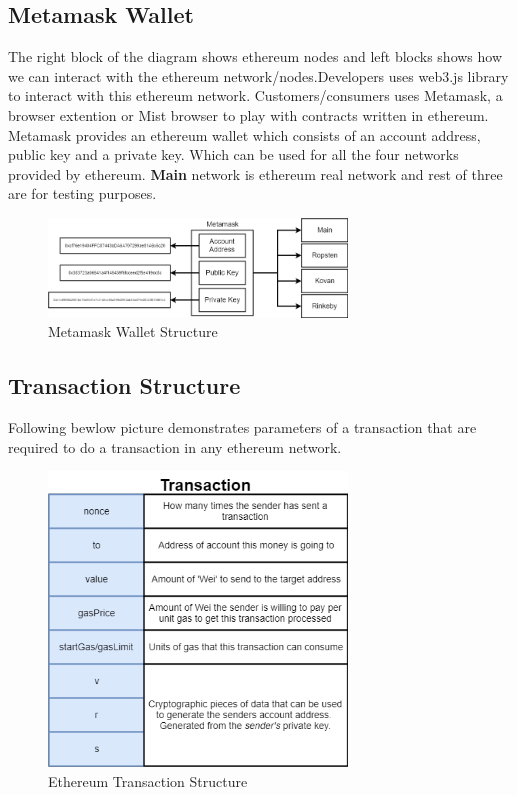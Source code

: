 \subsection{Metamask Wallet}
The right block of the diagram shows ethereum nodes and left blocks shows how we can interact with the ethereum network/nodes.Developers uses web3.js library to interact with this ethereum network. Customers/consumers uses Metamask, a browser extention or Mist browser to play with contracts written in ethereum.\\
Metamask provides an ethereum wallet which consists of an account address, public key and a private key. Which can be used for all the four networks provided by ethereum. \textbf{Main} network is ethereum real network and rest of three are for testing purposes.
\begin{figure}[h]
	\centering
	\includegraphics[width=300px]{figures/Ethereum/05.png}
	\caption{Metamask Wallet Structure}
	\label{fig:eth5}
\end{figure}

\subsection{Transaction Structure}
Following bewlow picture demonstrates parameters of a transaction that are required to do a transaction in any ethereum network.
\begin{figure}[h]
	\centering
	\includegraphics[width=300px]{figures/Ethereum/06.png}
	\caption{Ethereum Transaction Structure}
	\label{fig:eth6}
\end{figure}

